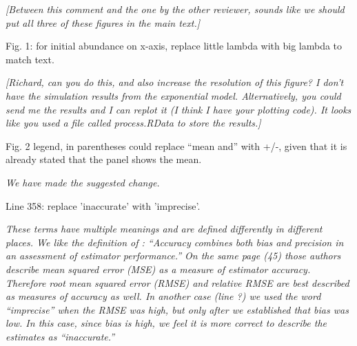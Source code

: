 \documentclass[12pt,english]{article}
\begin{document}
\begin{spacing}{1.9}
\begin{flushleft}
\vspace{0.5cm}
\textit{[Between this comment and the one by the other reviewer, sounds like we should 
put all three of these figures in the main text.]}
\vspace{0.5cm}

Fig. 1: for initial abundance on x-axis, replace little lambda with big lambda
to match text.

\vspace{0.5cm}
\textit{[Richard, can you do this, and also increase the resolution of this figure?
I don't have the simulation results from the exponential model.  Alternatively,
you could send me the results and I can replot it (I think I have your plotting code).
It looks like you used a file called process.RData to store the results.]}
\vspace{0.5cm}

Fig. 2 legend, in parentheses could replace ``mean and'' with +/-, given that it
is already stated that the panel shows the mean.

\vspace{0.5cm}
\textit{We have made the suggested change.}
\vspace{0.5cm}

Line 358: replace 'inaccurate' with 'imprecise'.

\vspace{0.5cm}
\textit{These terms have multiple meanings and are defined differently in
different places.  We like the definition of \citet{williams_etal:2002}:
``Accuracy combines both bias and precision in an assessment of estimator
performance.''  On the same page (45) those authors describe mean squared error 
(MSE) as a measure of estimator accuracy.  Therefore root mean squared error (RMSE) and
relative RMSE are best described as measures of accuracy as well.  
In another case (line ?) we used the
word ``imprecise'' when the RMSE was high, but only after we established that
bias was low.  In this case, since bias is high, we feel it is more correct to describe
the estimates as ``inaccurate.''}
\vspace{0.5cm}


\end{flushleft}
\end{spacing}
\end{document}
